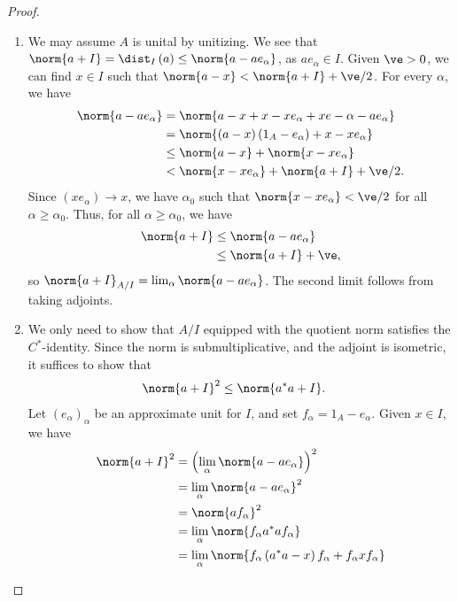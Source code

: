 \documentclass[10pt]{mypackage}
\begin{document}
\begin{proof}\hfill
  \begin{enumerate}[(1)]
    \item We may assume $A$ is unital by unitizing. We see that $\norm{a+I} = \dist_{I}\left(a\right) \leq \norm{a-ae_{\alpha}}$, as $ae_{\alpha}\in I$. Given $\ve > 0$, we can find $x\in I$ such that $\norm{a-x} < \norm{a+I} + \ve/2$. For every $\alpha$, we have
      \begin{align*}
        \norm{a-ae_{\alpha}} &= \norm{a-x+x-xe_{\alpha}+xe-{\alpha}-ae_{\alpha}}\\
                             &= \norm{\left(a-x\right)\left(1_A - e_{\alpha}\right) + x-xe_{\alpha}}\\
                             &\leq \norm{a-x} + \norm{x-xe_{\alpha}}\\
                             &< \norm{x-xe_{\alpha}} + \norm{a+I} + \ve/2.
      \end{align*}
      Since $\left(xe_{\alpha}\right)\rightarrow x$, we have $\alpha_0$ such that $\norm{x-xe_{\alpha}} < \ve/2$ for all $\alpha\geq \alpha_0$. Thus, for all $\alpha\geq \alpha_0$, we have
      \begin{align*}
        \norm{a+I} &\leq \norm{a-ae_{\alpha}}\\
                   &\leq \norm{a+I} + \ve,
      \end{align*}
      so $\norm{a+I}_{A/I} = \lim_{\alpha}\norm{a-ae_{\alpha}}$. The second limit follows from taking adjoints.
    \item We only need to show that $A/I$ equipped with the quotient norm satisfies the $C^{\ast}$-identity. Since the norm is submultiplicative, and the adjoint is isometric, it suffices to show that
      \begin{align*}
        \norm{a+I}^2 &\leq \norm{a^{\ast}a + I}.
      \end{align*}
      Let $\left(e_{\alpha}\right)_{\alpha}$ be an approximate unit for $I$, and set $f_{\alpha} = 1_A - e_{\alpha}$. Given $x\in I$, we have
      \begin{align*}
        \norm{a+I}^2 &= \left(\lim_{\alpha}\norm{a-ae_{\alpha}}\right)^2\\
                     &= \lim_{\alpha}\norm{a-ae_{\alpha}}^2\\
                     &= \norm{af_{\alpha}}^2\\
                     &= \lim_{\alpha}\norm{f_{\alpha}a^{\ast}af_{\alpha}}\\
                     &= \lim_{\alpha}\norm{f_{\alpha}\left(a^{\ast}a - x\right)f_{\alpha} + f_{\alpha}xf_{\alpha}}\\

\end{align*}
\end{enumerate}
\end{proof}
\end{document}
